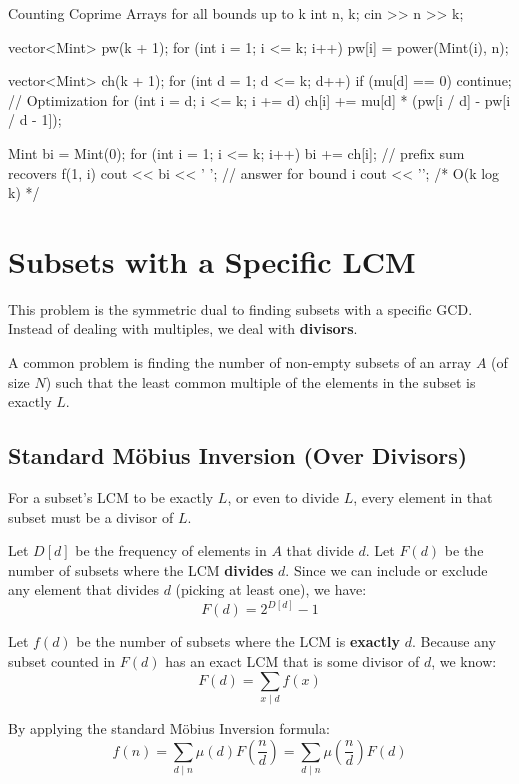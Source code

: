 \documentclass[11pt]{article}
\begin{document}
\begin{vscode}{Counting Coprime Arrays for all bounds up to k}
int n, k;
cin >> n >> k;

vector<Mint> pw(k + 1);
for (int i = 1; i <= k; i++)
    pw[i] = power(Mint(i), n);

vector<Mint> ch(k + 1);
for (int d = 1; d <= k; d++)
{
    if (mu[d] == 0)
        continue; // Optimization
    for (int i = d; i <= k; i += d)
        ch[i] += mu[d] * (pw[i / d] - pw[i / d - 1]);
}

Mint bi = Mint(0);
for (int i = 1; i <= k; i++)
{
    bi += ch[i];       // prefix sum recovers f(1, i)
    cout << bi << ' '; // answer for bound i
}
cout << '\n';
/* O(k log k) */
\end{vscode}

\pagebreak
\section{Subsets with a Specific LCM}
\label{sec:subsets_lcm}

This problem is the symmetric dual to finding subsets with a specific GCD. Instead of dealing with multiples, we deal with \textbf{divisors}.

A common problem is finding the number of non-empty subsets of an array $A$ (of size $N$) such that the least common multiple of the elements in the subset is exactly $L$.

\subsection{Standard Möbius Inversion (Over Divisors)}

\begin{derivation}
    For a subset's LCM to be exactly $L$, or even to divide $L$, every element in that subset must be a divisor of $L$.

    Let $D[d]$ be the frequency of elements in $A$ that divide $d$.
    Let $F(d)$ be the number of subsets where the LCM \textbf{divides} $d$. Since we can include or exclude any element that divides $d$ (picking at least one), we have:
    \[ F(d) = 2^{D[d]} - 1 \]

    Let $f(d)$ be the number of subsets where the LCM is \textbf{exactly} $d$.
    Because any subset counted in $F(d)$ has an exact LCM that is some divisor of $d$, we know:
    \[ F(d) = \sum_{x \mid d} f(x) \]

    By applying the standard Möbius Inversion formula:
    \[ f(n) = \sum_{d \mid n} \mu(d) F\left(\frac{n}{d}\right) = \sum_{d \mid n} \mu\left(\frac{n}{d}\right) F(d) \]
\end{derivation}
\end{document}
